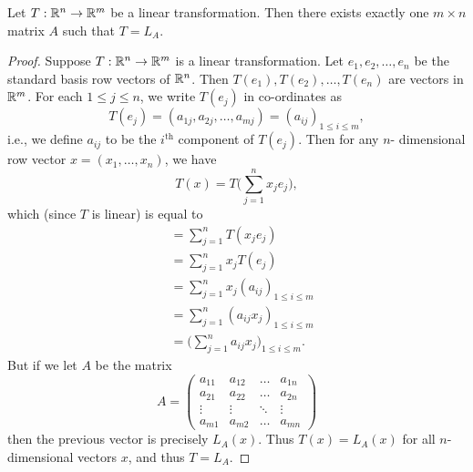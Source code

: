 \setcounter{thm}{12}
\begin{lem}\label{6.1.13}
  Let \(T : \mathbb{R}^n \to \mathbb{R}^m\) be a linear transformation.
  Then there exists exactly one \(m \times n\) matrix \(A\) such that \(T = L_A\).
\end{lem}

\begin{proof}
  Suppose \(T : \mathbb{R}^n \to \mathbb{R}^m\) is a linear transformation.
  Let \(e_1, e_2, \dots, e_n\) be the standard basis row vectors of \(\mathbb{R}^n\).
  Then \(T(e_1), T(e_2), \dots, T(e_n)\) are vectors in \(\mathbb{R}^m\).
  For each \(1 \leq j \leq n\), we write \(T(e_j)\) in co-ordinates as
  \[
    T(e_j) = (a_{1j}, a_{2j}, \dots, a_{mj}) = (a_{ij})_{1 \leq i \leq m},
  \]
  i.e., we define \(a_{ij}\) to be the \(i^{\text{th}}\) component of \(T(e_j)\).
  Then for any \(n\)- dimensional row vector \(x = (x_1, \dots, x_n)\), we have
  \[
    T(x) = T\bigg(\sum_{j = 1}^n x_j e_j\bigg),
  \]
  which (since \(T\) is linear) is equal to
  \begin{align*}
     & = \sum_{j = 1}^n T(x_j e_j)                                \\
     & = \sum_{j = 1}^n x_j T(e_j)                                \\
     & = \sum_{j = 1}^n x_j (a_{ij})_{1 \leq i \leq m}            \\
     & = \sum_{j = 1}^n (a_{ij} x_j)_{1 \leq i \leq m}            \\
     & = \bigg(\sum_{j = 1}^n a_{ij} x_j\bigg)_{1 \leq i \leq m}.
  \end{align*}
  But if we let \(A\) be the matrix
  \[
    A = \begin{pmatrix}
      a_{11} & a_{12} & \dots  & a_{1n} \\
      a_{21} & a_{22} & \dots  & a_{2n} \\
      \vdots & \vdots & \ddots & \vdots \\
      a_{m1} & a_{m2} & \dots  & a_{mn}
    \end{pmatrix}
  \]
  then the previous vector is precisely \(L_A(x)\).
  Thus \(T(x) = L_A(x)\) for all \(n\)-dimensional vectors \(x\), and thus \(T = L_A\).


\end{proof}
